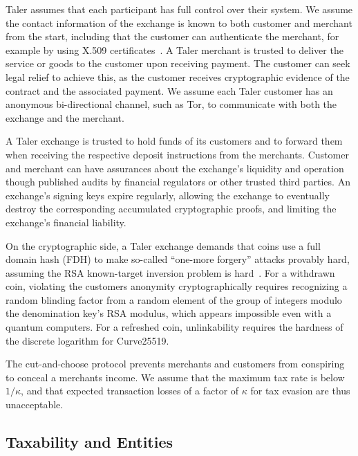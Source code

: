\documentclass[sigconf, authordraft]{acmart}
\begin{document}
Taler assumes that each participant has full control over their
system.  We assume the contact information of the exchange is known to
both customer and merchant from the start, including that the customer
can authenticate the merchant, for example by using X.509
certificates~\cite{rfc6818}.  A Taler merchant is trusted to deliver
the service or goods to the customer upon receiving payment.  The
customer can seek legal relief to achieve this, as the customer
receives cryptographic evidence of the contract and the associated
payment.  We assume each Taler customer has an anonymous
bi-directional channel, such as Tor, to communicate with both the
exchange and the merchant.

A Taler exchange is trusted to hold funds of its customers and to
forward them when receiving the respective deposit instructions from
the merchants.  Customer and merchant can have assurances about the
exchange's liquidity and operation though published audits by
financial regulators or other trusted third parties.  An exchange's
signing keys expire regularly, allowing the exchange to eventually
destroy the corresponding accumulated cryptographic proofs, and
limiting the exchange's financial liability.

On the cryptographic side, a Taler exchange demands that coins use a
full domain hash (FDH) to make so-called ``one-more forgery'' attacks
provably hard, assuming the RSA known-target inversion problem is
hard~\cite[Theorem 12]{RSA-HDF-KTIvCTI}.  For a withdrawn coin,
violating the customers anonymity cryptographically requires recognizing
a random blinding factor from a random element of the group of
integers modulo the denomination key's RSA modulus, which appears
impossible even with a quantum computers.  For a refreshed coin,
unlinkability requires the hardness of the discrete logarithm for
Curve25519.

The cut-and-choose protocol prevents merchants and customers from
conspiring to conceal a merchants income.  We assume that the maximum
tax rate is below $1/\kappa$, and that expected transaction losses of
a factor of $\kappa$ for tax evasion are thus unacceptable.


\subsection{Taxability and Entities}
\end{document}
